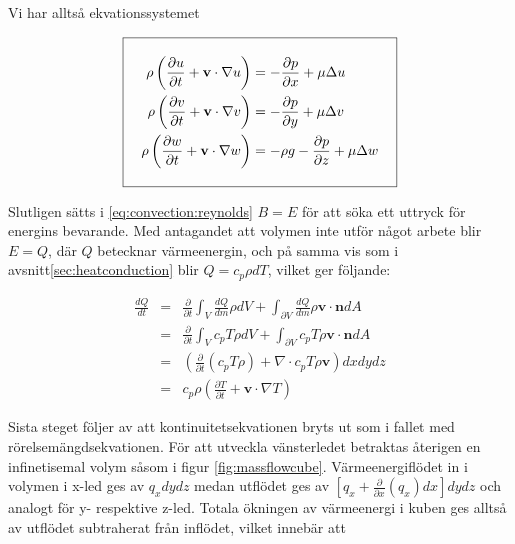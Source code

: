 
Vi har alltså ekvationssystemet

\begin{equation}
\label{eq:convection:momentum}
\addtolength{\fboxsep}{10pt} 
\boxed{ 
\begin{aligned} 
\rho\left(\frac{\partial u}{\partial t} + \mathbf{v}\cdot \nabla u\right) & = -\frac{\partial p}{\partial x} + \mu\Delta u\\
\rho\left(\frac{\partial v}{\partial t} + \mathbf{v}\cdot \nabla v\right) & = -\frac{\partial p}{\partial y} + \mu\Delta v\\
\rho\left(\frac{\partial w}{\partial t} + \mathbf{v}\cdot \nabla w\right) & = -\rho g -\frac{\partial p}{\partial z} + \mu\Delta w  
\end{aligned} 
} 
\end{equation}


Slutligen sätts i \ref{eq:convection:reynolds} $B=E$ för att söka ett uttryck för energins bevarande. Med antagandet att volymen inte utför något arbete blir $E = Q$, där $Q$ betecknar värmeenergin, och på samma vis som i avsnitt\ref{sec:heatconduction} blir $Q = c_p \rho dT$, vilket ger följande:

\begin{eqnarray}
\label{reynoldsenergyone}
\frac{dQ}{dt} & = & \frac{\partial}{\partial t} \int_V \frac{dQ}{dm}\rho dV + \int_{\partial V}\frac{dQ}{dm}\rho \mathbf{v} \cdot \mathbf{n} dA \nonumber\\
& = & \frac{\partial}{\partial t} \int_V c_p T \rho dV + \int_{\partial V} c_p T \rho \mathbf{v} \cdot \mathbf{n} dA \nonumber\\
& = & \left(\frac{\partial}{\partial t} \left( c_p T \rho \right) + \nabla\cdot c_p T \rho \mathbf{v}\right) dxdydz \nonumber\\
& = & c_p \rho \left( \frac{\partial T}{\partial t} + \mathbf{v}\cdot \nabla T\right)
\end{eqnarray}

Sista steget följer av att kontinuitetsekvationen bryts ut som i fallet med rörelsemängdsekvationen. För att utveckla vänsterledet betraktas återigen en infinetisemal volym såsom i figur \ref{fig:massflowcube}. Värmeenergiflödet in i volymen i x-led ges av $q_x dy dz$ medan utflödet ges av $\left[ q_x + \frac{\partial}{\partial x} \left( q_x\right)dx\right]dydz$ och analogt för y- respektive z-led. Totala ökningen av värmeenergi i kuben ges alltså av utflödet subtraherat från inflödet, vilket innebär att

